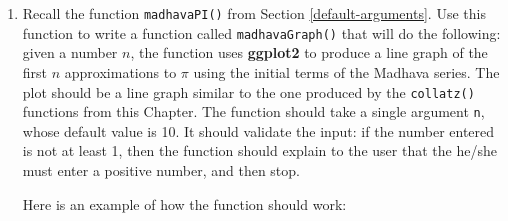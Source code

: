 \documentclass[]{book}
\theoremstyle{definition}
\theoremstyle{definition}
\theoremstyle{definition}
\theoremstyle{remark}
\begin{document}
{\begin{enumerate}
  \begin{quote}
  98 bottles of beer on the wall,
  \end{quote}

  \begin{quote}
  98 bottles of beer!
  \end{quote}

  \begin{quote}
  Take one down and pass it around:
  \end{quote}

  \begin{quote}
  97 bottles of beer on the wall.
  \end{quote}

  \begin{quote}
  \ldots{}
  \end{quote}

  \begin{quote}
  1 bottle of beer on the wall.
  \end{quote}

  \begin{quote}
  1 bottle of beer!
  \end{quote}

  \begin{quote}
  Take it down and pass it around:
  \end{quote}

  \begin{quote}
  No more bottles of beer on the wall.
  \end{quote}

  Make sure to get the lyrics exactly right. For example, it's ``1
  bottle'', not ``1 bottles''.
\item
  Recall the function \texttt{madhavaPI()} from Section
  \ref{default-arguments}. Use this function to write a function called
  \texttt{madhavaGraph()} that will do the following: given a number
  \(n\), the function uses \textbf{ggplot2} to produce a line graph of
  the first \(n\) approximations to \(\pi\) using the initial terms of
  the Madhava series. The plot should be a line graph similar to the one
  produced by the \texttt{collatz()} functions from this Chapter. The
  function should take a single argument \texttt{n}, whose default value
  is 10. It should validate the input: if the number entered is not at
  least 1, then the function should explain to the user that the he/she
  must enter a positive number, and then stop.

  Here is an example of how the function should work:


\end{enumerate}}
\end{document}
